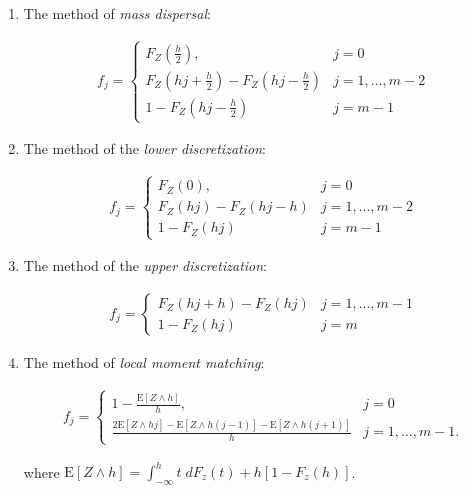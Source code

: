 \documentclass{article}
\begin{document}
\begin{enumerate}
    \item The method of \textit{mass dispersal}:
    

    \begin{align*}
    f_j= \begin{cases}F_Z \left( \frac{h}{2} \right), & j=0 \\ F_Z\left( hj+ \frac{h}{2} \right)-F_Z\left(hj-\frac{h}{2}\right) &  j=1,\ldots,m-2\\
     1-F_Z\left(hj-\frac{h}{2}\right) &  j=m-1 \end{cases}
    \end{align*}

    \item The method of the \textit{lower discretization}:
    

    \begin{align*}
    f_j= \begin{cases}F_Z \left( 0 \right), & j=0 \\ F_Z\left( hj\right)-F_Z\left(hj-h\right) &  j=1,\ldots,m-2\\
     1-F_Z\left(hj\right) &  j=m-1 \end{cases}
    \end{align*}

\item The method of the \textit{upper discretization}:

    \begin{align*}
    f_j= \begin{cases}F_Z\left( hj+ h \right)-F_Z\left(hj\right) &  j=1,\ldots,m-1\\
     1-F_Z\left(hj\right) &  j=m \end{cases}
    \end{align*}
    
    \item The method of \textit{local moment matching}: 
    
    \begin{align*}
    f_j= \begin{cases}1-\frac{\mathrm{E}[Z\wedge h] }{h}, & j=0 \\ \frac{2 \mathrm{E}[Z \wedge h j]-\mathrm{E}[Z \wedge h (j-1) ]-\mathrm{E}[Z \wedge h (j+1) ]}{h} &  j=1,\ldots,m-1.\end{cases}
    \end{align*}

    where $\mathrm{E}[Z\wedge h] = \int_{-\infty}^h t \; dF_z(t)+h[1-F_z(h)]$.


\end{enumerate}
\end{document}
